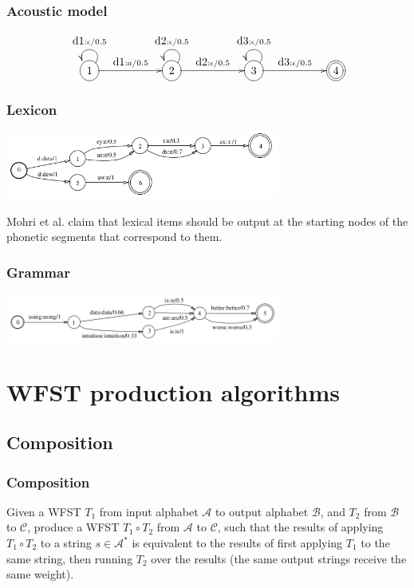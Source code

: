 \documentclass{beamer}
\newcommand{\<}{\langle}
\renewcommand{\>}{\rangle}
\begin{document}
\begin{frame}
  \frametitle{Acoustic model}

  $$
  \begin{xy}
    \entrymodifiers={++[o][F-]}
    \xymatrix@C=2cm{
      {1} \ar[r]^{\mbox{d1}:a/0.5}
      \ar@(ur,ul)[ud]_{\mbox{d1}:\epsilon/0.5}& 2
      \ar[r]^{\mbox{d2}:\epsilon/0.5}
      \ar@(ur,ul)[ud]_{\mbox{d2}:\epsilon/0.5} & 3
      \ar[r]^{\mbox{d3}:\epsilon/0.5}
      \ar@(ur,ul)[ud]_{\mbox{d3}:\epsilon/0.5} & *++[o][F=]{4} 
    }
  \end{xy}
  $$

\end{frame}

\begin{frame}
  \frametitle{Lexicon}

  \includegraphics[width=9cm]{lexical-transducer.png}

  Mohri et al. claim that lexical items should be output at the
  starting nodes of the phonetic segments that correspond to them.
\end{frame}

\begin{frame}
  \frametitle{Grammar}

  \includegraphics[width=9cm]{grammar-transducer.png}
\end{frame}

\section{WFST production algorithms}

\subsection{Composition}

\begin{frame}
  \frametitle{Composition}

  Given a WFST $T_1$ from input alphabet $\mathcal{A}$ to output alphabet
  $\mathcal{B}$, and $T_2$ from $\mathcal{B}$ to $\mathcal{C}$, produce a WFST $T_1 \circ
  T_2$ from $\mathcal{A}$ to $\mathcal{C}$, such that the results of applying $T_1
  \circ T_2$ to a string $s \in \mathcal{A}^*$ is equivalent to the results of
  first applying $T_1$ to the same string, then running $T_2$ over the
  results (the same output strings receive the same weight).
\end{frame}
\end{document}
